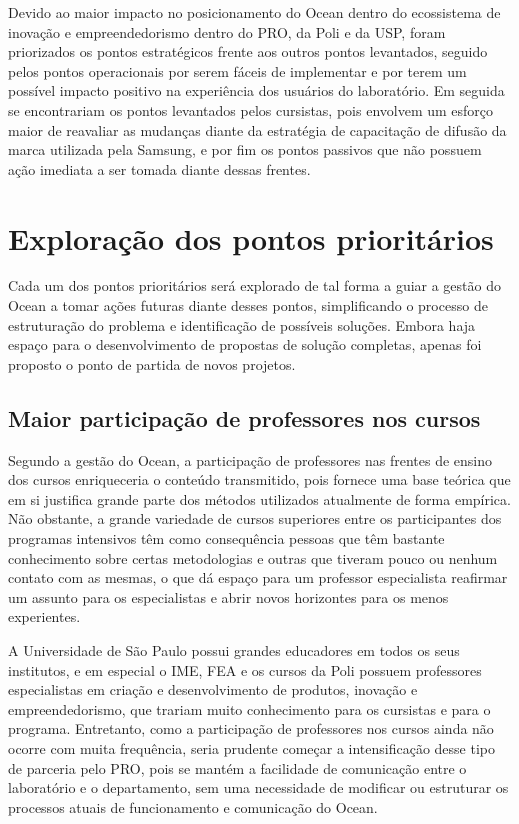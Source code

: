 Devido ao maior impacto no posicionamento do Ocean dentro do ecossistema de inovação e empreendedorismo dentro do PRO, da Poli e da USP, foram priorizados os pontos estratégicos frente aos outros pontos levantados, seguido pelos pontos operacionais por serem fáceis de implementar e por terem um possível impacto positivo na experiência dos usuários do laboratório. Em seguida se encontrariam os pontos levantados pelos cursistas, pois envolvem um esforço maior de reavaliar as mudanças diante da estratégia de capacitação de difusão da marca utilizada pela Samsung, e por fim os pontos passivos que não possuem ação imediata a ser tomada diante dessas frentes.

\section{Exploração dos pontos prioritários}

Cada um dos pontos prioritários será explorado de tal forma a guiar a gestão do Ocean a tomar ações futuras diante desses pontos, simplificando o processo de estruturação do problema e identificação de possíveis soluções. Embora haja espaço para o desenvolvimento de propostas de solução completas, apenas foi proposto o ponto de partida de novos projetos.

\subsection{Maior participação de professores nos cursos}

Segundo a gestão do Ocean, a participação de professores nas frentes de ensino dos cursos enriqueceria o conteúdo transmitido, pois fornece uma base teórica que em si justifica grande parte dos métodos utilizados atualmente de forma empírica. Não obstante, a grande variedade de cursos superiores entre os participantes dos programas intensivos têm como consequência pessoas que têm bastante conhecimento sobre certas metodologias e outras que tiveram pouco ou nenhum  contato com as mesmas, o que dá espaço para um professor especialista reafirmar um assunto para os especialistas e abrir novos horizontes para os menos experientes. 

A Universidade de São Paulo possui grandes educadores em todos os seus institutos, e em especial o IME, FEA e os cursos da Poli possuem professores especialistas em criação e desenvolvimento de produtos, inovação e empreendedorismo, que trariam muito conhecimento para os cursistas e para o programa. Entretanto, como a participação de professores nos cursos ainda não ocorre com muita frequência, seria prudente começar a intensificação desse tipo de parceria pelo PRO, pois se mantém a facilidade de comunicação entre o laboratório e o departamento, sem uma necessidade de modificar ou estruturar os processos atuais de funcionamento e comunicação do Ocean.

